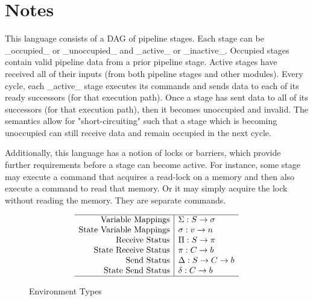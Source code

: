 \documentclass{article}
\begin{document}
\section{Notes}

This language consists of a DAG of pipeline stages.
Each stage can be _occupied_ or _unoccupied_ and _active_ or _inactive_.
Occupied stages contain valid pipeline data from a prior
pipeline stage.
Active stages have received all of their inputs (from both
pipeline stages and other modules).
Every cycle, each _active_ stage executes its commands
and sends data to each of its ready successors (for that execution path).
Once a stage has sent data to all of its successors (for that execution path),
then it becomes unoccupied and invalid.
The semantics allow for "short-circuiting" such that a stage which is
becoming unoccupied can still receive data and remain occupied in the next cycle.

Additionally, this language has a notion of locks or barriers,
which provide further requirements before a stage can become active.
For instance, some stage may execute a command that acquires a read-lock
on a memory and then also execute a command to read that memory. Or it may
simply acquire the lock without reading the memory. They are separate commands.

\begin{figure}
  \[\begin{array}{r|l} \hline
    \text{Variable Mappings} & \Sigma: S \rightarrow \sigma \\
    \text{State Variable Mappings} & \sigma: v \rightarrow n \\
    \text{Receive Status} & \Pi: S \rightarrow \pi \\
    \text{State Receive Status} & \pi: C \rightarrow b \\
    \text{Send Status} & \Delta: S \rightarrow C \rightarrow b \\
    \text{State Send Status} & \delta: C \rightarrow b \\ \hline
  \end{array}\]
  \caption{Environment Types}
\end{figure}
\end{document}
